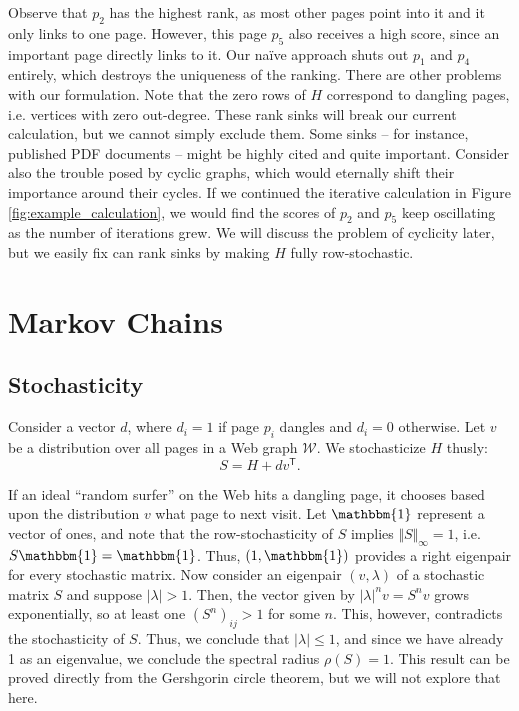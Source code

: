 \documentclass[12pt]{article}
\newcommand{\transpose}[1]{#1^{\mathsf{T}}}
\begin{document}
Observe that $p_2$ has the highest rank, as most other pages point into it
and it only links to one page. However, this page $p_5$ also receives a high
score, since an important page directly links to it. Our na{\"i}ve approach
shuts out $p_1$ and $p_4$ entirely, which destroys the uniqueness of the
ranking. There are other problems with our formulation. Note that the zero
rows of $H$ correspond to dangling pages, i.e. vertices with zero
out-degree. These rank sinks will break our current calculation, but we
cannot simply exclude them. Some sinks -- for instance, published PDF
documents -- might be highly cited and quite important. Consider also the
trouble posed by cyclic graphs, which would eternally shift their importance
around their cycles. If we continued the iterative calculation in Figure
\ref{fig:example_calculation}, we would find the scores of $p_2$ and $p_5$
keep oscillating as the number of iterations grew. We will discuss the
problem of cyclicity later, but we easily fix can rank sinks by making $H$
fully row-stochastic.



\section{Markov Chains}


\subsection{Stochasticity}
Consider a vector $d$, where $d_i=1$ if page $p_i$ dangles and $d_i=0$
otherwise. Let $v$ be a distribution over all pages in a Web graph
$\mathcal{W}$. We stochasticize $H$ thusly:
\begin{equation}
  \label{eqn:S}
  S=H + d\transpose{v}.
\end{equation}

If an ideal ``random surfer'' on the Web hits a dangling page, it chooses based
upon the distribution $v$ what page to next visit. Let $\mathbbm{1}$ represent a
vector of ones, and note that the row-stochasticity of $S$ implies
$\Vert S \Vert_{\infty} = 1$, i.e. $S \mathbbm{1} = \mathbbm{1}$. Thus,
$(1, \mathbbm{1})$ provides a right eigenpair for every stochastic matrix. Now
consider an eigenpair $(v, \lambda)$ of a stochastic matrix $S$ and suppose
$|\lambda| > 1$. Then, the vector given by $|\lambda|^n v = S^n v$ grows
exponentially, so at least one $(S^n)_{ij} > 1$ for some $n$. This, however,
contradicts the stochasticity of $S$. Thus, we conclude that $|\lambda| \leq 1$,
and since we have already 1 as an eigenvalue, we conclude the spectral radius
$\rho(S)=1$. This result can be proved directly from the Gershgorin circle
theorem, but we will not explore that here.
\end{document}
